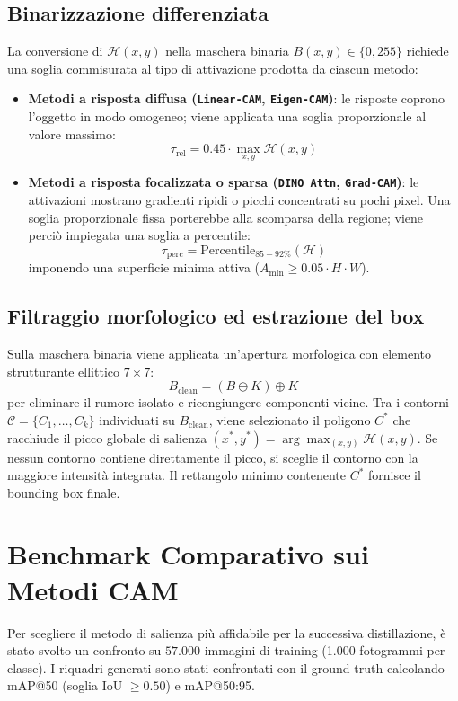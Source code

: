 \subsection{Binarizzazione differenziata}
La conversione di $\mathcal{H}(x, y)$ nella maschera binaria $B(x, y) \in \{0, 255\}$ richiede una soglia commisurata al tipo di attivazione prodotta da ciascun metodo:
\begin{itemize}
    \item \textbf{Metodi a risposta diffusa (\texttt{Linear-CAM}, \texttt{Eigen-CAM})}: le risposte coprono l'oggetto in modo omogeneo; viene applicata una soglia proporzionale al valore massimo:
    \begin{equation}
        \tau_{\text{rel}} = 0.45 \cdot \max_{x, y} \mathcal{H}(x, y)
    \end{equation}
    \item \textbf{Metodi a risposta focalizzata o sparsa (\texttt{DINO Attn}, \texttt{Grad-CAM})}: le attivazioni mostrano gradienti ripidi o picchi concentrati su pochi pixel. Una soglia proporzionale fissa porterebbe alla scomparsa della regione; viene perciò impiegata una soglia a percentile:
    \begin{equation}
        \tau_{\text{perc}} = \text{Percentile}_{85-92\%}(\mathcal{H})
    \end{equation}
    imponendo una superficie minima attiva ($A_{\min} \ge 0.05 \cdot H \cdot W$).
\end{itemize}

\subsection{Filtraggio morfologico ed estrazione del box}
Sulla maschera binaria viene applicata un'apertura morfologica con elemento strutturante ellittico $7 \times 7$:
\begin{equation}
    B_{\text{clean}} = (B \ominus K) \oplus K
\end{equation}
per eliminare il rumore isolato e ricongiungere componenti vicine.
Tra i contorni $\mathcal{C} = \{C_1, \dots, C_k\}$ individuati su $B_{\text{clean}}$, viene selezionato il poligono $C^*$ che racchiude il picco globale di salienza $(x^*, y^*) = \arg\max_{(x, y)} \mathcal{H}(x, y)$. Se nessun contorno contiene direttamente il picco, si sceglie il contorno con la maggiore intensità integrata. Il rettangolo minimo contenente $C^*$ fornisce il bounding box finale.

\section{Benchmark Comparativo sui Metodi CAM}
\label{sec:wsol_benchmark}
Per scegliere il metodo di salienza più affidabile per la successiva distillazione, è stato svolto un confronto su $57.000$ immagini di training (1.000 fotogrammi per classe). I riquadri generati sono stati confrontati con il ground truth calcolando mAP@50 (soglia IoU $\ge 0.50$) e mAP@50:95.

